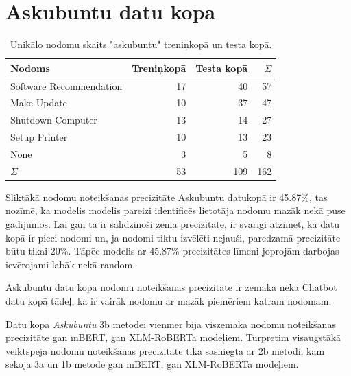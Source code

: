 \section{Askubuntu datu kopa}

\begin{table}[htbp]
  \centering
  \caption{Unikālo nodomu skaits "askubuntu" treniņkopā un testa kopā.}
    \begin{tabular}{lrrr} \toprule
    Nodoms & Treniņkopā & Testa kopā & $\Sigma$ \\\midrule
    Software Recommendation & 17    & 40 & 57 \\
    Make Update & 10    & 37 & 47 \\
    Shutdown Computer & 13    & 14 & 27 \\
    Setup Printer & 10    & 13 & 23\\
    None  & 3     & 5 & 8\\
   $\Sigma$ & 53    & 109 & 162 \\\bottomrule
    \end{tabular}%
  \label{tab:askubuntu-labels}%
\end{table}%



Sliktākā nodomu noteikšanas precizitāte Askubuntu datukopā ir 45.87\%, tas nozīmē, ka modelis modelis pareizi identificēs lietotāja nodomu mazāk nekā puse gadījumos. Lai gan tā ir salīdzinoši zema precizitāte, ir svarīgi atzīmēt, ka datu kopā ir pieci nodomi un, ja nodomi tiktu izvēlēti nejauši, paredzamā precizitāte būtu tikai 20\%. Tāpēc modelis ar 45.87\% precizitātes līmeni joprojām darbojas ievērojami labāk nekā random.

Askubuntu datu kopā nodomu noteikšanas precizitāte ir zemāka nekā Chatbot datu kopā tādeļ, ka ir vairāk nodomu ar mazāk piemēriem katram nodomam.

Datu kopā \textit{Askubuntu} 3b metodei vienmēr bija viszemākā nodomu noteikšanas precizitāte gan mBERT, gan XLM-RoBERTa modeļiem. Turpretim visaugstākā veiktspēja nodomu noteikšanas precizitātē tika sasniegta ar 2b metodi, kam sekoja 3a un 1b metode gan mBERT, gan XLM-RoBERTa modeļiem.


